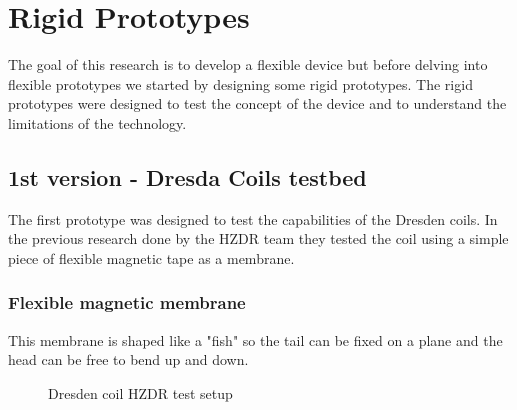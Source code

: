\section{Rigid Prototypes}
The goal of this research is to develop a flexible device but before delving into flexible prototypes we started by designing some rigid prototypes. The rigid prototypes were designed to test the concept of the device and to understand the limitations of the technology.

\subsection{1st version - Dresda Coils testbed}
The first prototype was designed to test the capabilities of the Dresden coils.
In the previous research done by the HZDR team \cite{HZDR} they tested the coil using a simple piece of flexible magnetic tape as a membrane.

\subsubsection{Flexible magnetic membrane}
This membrane is shaped like a "fish" so the tail can be fixed on a plane and the head can be free to bend up and down.

\begin{figure}
    \centering
    \caption{Dresden coil HZDR test setup}
    \label{fig: Dresden_test}
\end{figure}

